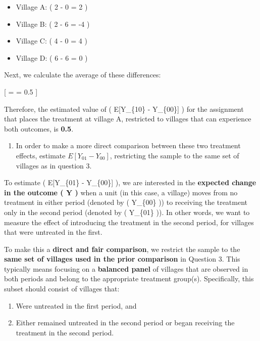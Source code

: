 \documentclass[
  letterpaper,
  DIV=11,
  numbers=noendperiod]{scrartcl}
\providecommand{\tightlist}{%
  \setlength{\itemsep}{0pt}\setlength{\parskip}{0pt}}\usepackage{longtable,booktabs,array}
\begin{document}
\begin{itemize}
\tightlist
\item
  Village A: ( 2 - 0 = 2 )
\item
  Village B: ( 2 - 6 = -4 )
\item
  Village C: ( 4 - 0 = 4 )
\item
  Village D: ( 6 - 6 = 0 )
\end{itemize}

Next, we calculate the average of these differences:

{[}  =  = 0.5 {]}

Therefore, the estimated value of ( E{[}Y\_\{10\} - Y\_\{00\}{]} ) for
the assignment that places the treatment at village A, restricted to
villages that can experience both outcomes, is \textbf{0.5}.

\begin{enumerate}
\def\labelenumi{\arabic{enumi}.}
\setcounter{enumi}{2}
\tightlist
\item
  In order to make a more direct comparison between these two treatment
  effects, estimate \(E[Y_{01} - Y_{00}]\), restricting the sample to
  the same set of villages as in question 3.
\end{enumerate}

To estimate ( E{[}Y\_\{01\} - Y\_\{00\}{]} ), we are interested in the
\textbf{expected change in the outcome ( Y )} when a unit (in this case,
a village) moves from no treatment in either period (denoted by (
Y\_\{00\} )) to receiving the treatment only in the second period
(denoted by ( Y\_\{01\} )). In other words, we want to measure the
effect of introducing the treatment in the second period, for villages
that were untreated in the first.

To make this a \textbf{direct and fair comparison}, we restrict the
sample to the \textbf{same set of villages used in the prior comparison}
in Question 3. This typically means focusing on a \textbf{balanced
panel} of villages that are observed in both periods and belong to the
appropriate treatment group(s). Specifically, this subset should consist
of villages that:

\begin{enumerate}
\def\labelenumi{\arabic{enumi}.}
\tightlist
\item
  Were untreated in the first period, and
\item
  Either remained untreated in the second period or began receiving the
  treatment in the second period.
\end{enumerate}
\end{document}
